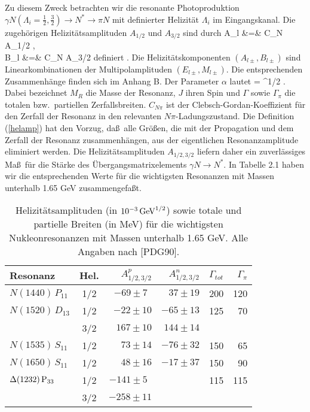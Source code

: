 Zu diesem Zweck betrachten wir die resonante Photoproduktion
$\gamma N(\Lambda_i=\frac{1}{2},\frac{3}{2}) \to N^{*} \to \pi N$
mit definierter Helizit\"at $\Lambda_i$ im Eingangskanal. Die
zugeh\"origen Helizit\"atsamplituden $A_{1/2}$ und $A_{3/2}$ sind durch
\beq
\label{helamp}
 A_{l\pm} &=& \mp \alpha C_{N\pi} A_{1/2}\; ,  \\
 B_{l\pm} &=& \pm {} C_{N\pi} A_{3/2}
\eeq
definiert \cite{PDG90}. Die Helizit\"atskomponenten $(A_{l\pm},B_{l\pm})$ 
sind Linearkombinationen der Multipolamplituden $(E_{l\pm},M_{l\pm})$.
Die entsprechenden Zusammenh\"ange finden sich im Anhang B. Der
Parameter $\alpha$ lautet
\be
 \alpha = ^{1/2} \; .
\ee
Dabei bezeichnet $M_R$ die Masse der Resonanz, $J$ ihren Spin
und $\Gamma$ sowie $\Gamma_\pi$ die totalen bzw.~partiellen Zerfallsbreiten.
$C_{N\pi}$ ist der Clebsch-Gordan-Koeffizient f\"ur den Zerfall der 
Resonanz in den relevanten $N\pi$-Ladungszustand.  Die Definition
(\ref{helamp}) hat den Vorzug, da\ss\ alle Gr\"o\ss en, die mit der
Propagation und dem Zerfall der Resonanz zusammenh\"angen, aus
der  eigentlichen Resonanzamplitude eliminiert werden. Die 
Helizit\"atsamplituden $A_{1/2,3/2}$ liefern daher ein zuverl\"assiges
Ma\ss\ f\"ur die St\"arke des \"Ubergangsmatrixelements $\gamma N\to N^{*}$. 
In Tabelle 2.1 haben wir die entsprechenden Werte f\"ur die
wichtigsten Resonanzen mit Massen unterhalb 1.65 GeV zusammengefa\ss t. 
    
\begin{table}
\caption{Helizit\"atsamplituden (in $10^{-3}\,{\rm GeV}^{1/2}$) sowie
totale und partielle Breiten (in MeV) f\"ur die wichtigsten Nukleonresonanzen
mit Massen unterhalb 1.65 GeV. Alle Angaben nach [PDG90].}
\begin{center}
\begin{tabular}{|l||c|r|r|r|r|} \hline
  Resonanz             & Hel.  &  $A_{1/2,3/2}^p$ & $A_{1/2,3/2}^n$ 
		& $\Gamma_{tot}$ & $\Gamma_\pi$ \\ \hline\hline
 $N(1440)\,P_{11}$ & 1/2   &  $-69\pm 7\;\,$  & $37\pm 19$
                &  200         & 120   \\ 
 $N(1520)\,D_{13}$ & 1/2   &  $-22\pm 10$     & $-65\pm 13$
                &  125         &  70    \\
                       & 3/2   &  $167\pm 10$     & $144\pm 14$
		&              &        \\
 $N(1535)\,S_{11}$ & 1/2   &  $73\pm 14$      & $-76\pm 32$
                &  150         &   65    \\
 $N(1650)\,S_{11}$ & 1/2   &  $48\pm 16$      & $-17\pm 37$ 
                & 150	       &   90    \\
 $\Delta (1232)\,\rm P_{33}$ & 1/2 & $-141\pm 5\;\,$&
                &  115         &  115   \\
		        & 3/2  &  $-258\pm 11$    &          
		&              &        \\ \hline
\end{tabular}
\end{center}
\end{table}

